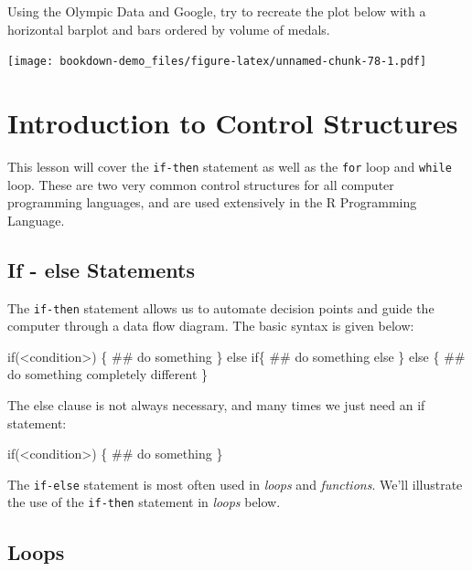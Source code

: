 \documentclass[]{book}
\newenvironment{Shaded}{\begin{snugshade}}{\end{snugshade}}
\newcommand{\NormalTok}[1]{{#1}}
\begin{document}
Using the Olympic Data and Google, try to recreate the plot below with a
horizontal barplot and bars ordered by volume of medals.

\texttt{[image: bookdown-demo\_files/figure-latex/unnamed-chunk-78-1.pdf]}

\chapter{Introduction to Control
Structures}\label{introduction-to-control-structures}

This lesson will cover the \texttt{if-then} statement as well as the
\texttt{for} loop and \texttt{while} loop. These are two very common
control structures for all computer programming languages, and are used
extensively in the R Programming Language.

\section{If - else Statements}\label{if---else-statements}

The \texttt{if-then} statement allows us to automate decision points and
guide the computer through a data flow diagram. The basic syntax is
given below:

\begin{Shaded}
\begin{Highlighting}[]
\NormalTok{if(<condition>) \{}
  \NormalTok{## do something}
\NormalTok{\} else if\{}
  \NormalTok{## do something else}
\NormalTok{\} else \{}
  \NormalTok{## do something completely different}
\NormalTok{\}}
\end{Highlighting}
\end{Shaded}

The else clause is not always necessary, and many times we just need an
if statement:

\begin{Shaded}
\begin{Highlighting}[]
\NormalTok{if(<condition>) \{}
  \NormalTok{## do something}
\NormalTok{\}}
\end{Highlighting}
\end{Shaded}

The \texttt{if-else} statement is most often used in \emph{loops} and
\emph{functions}. We'll illustrate the use of the \texttt{if-then}
statement in \emph{loops} below.

\section{Loops}\label{loops}
\end{document}
